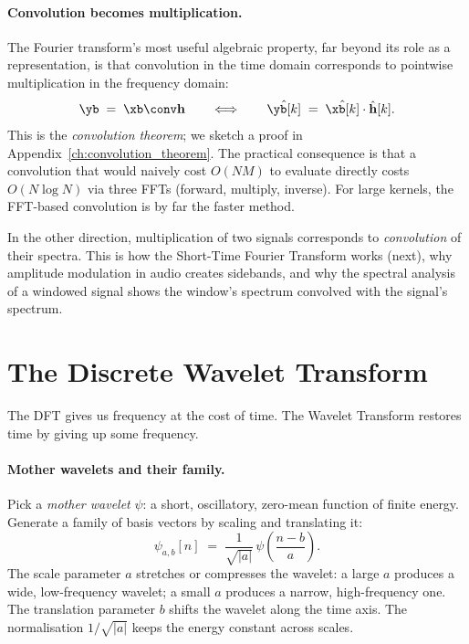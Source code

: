 \paragraph{Convolution becomes multiplication.}  The Fourier transform's
most useful algebraic property, far beyond its role as a representation,
is that convolution in the time domain corresponds to pointwise
multiplication in the frequency domain:
\begin{equation}
    \yb \;=\; \xb \conv \mathbf{h}
    \qquad \Longleftrightarrow \qquad
    \hat\yb[k] \;=\; \hat\xb[k] \cdot \hat{\mathbf{h}}[k].
    \label{eq:conv_theorem}
\end{equation}
This is the \emph{convolution theorem}; we sketch a proof in
Appendix~\ref{ch:convolution_theorem}.  The practical consequence is
that a convolution that would naively cost $O(NM)$ to evaluate directly
costs $O(N \log N)$ via three FFTs (forward, multiply, inverse).  For
large kernels, the FFT-based convolution is by far the faster method.

In the other direction, multiplication of two signals corresponds to
\emph{convolution} of their spectra.  This is how the Short-Time
Fourier Transform works (next), why amplitude modulation in audio
creates sidebands, and why the spectral analysis of a windowed signal
shows the window's spectrum convolved with the signal's spectrum.

\section{The Discrete Wavelet Transform}
\label{sec:dwt}

The DFT gives us frequency at the cost of time.  The Wavelet Transform
restores time by giving up some frequency.

\paragraph{Mother wavelets and their family.}  Pick a \emph{mother
wavelet} $\psi$: a short, oscillatory, zero-mean function of finite
energy.  Generate a family of basis vectors by scaling and translating
it:
\begin{equation}
    \psi_{a, b}[n]
    \;=\;
    \frac{1}{\sqrt{|a|}} \, \psi\!\left( \frac{n - b}{a} \right).
    \label{eq:wavelet_family}
\end{equation}
The scale parameter $a$ stretches or compresses the wavelet: a large
$a$ produces a wide, low-frequency wavelet; a small $a$ produces a
narrow, high-frequency one.  The translation parameter $b$ shifts the
wavelet along the time axis.  The normalisation $1/\sqrt{|a|}$ keeps the
energy constant across scales.

